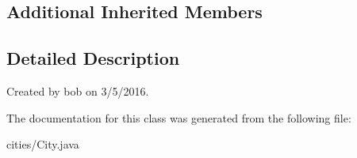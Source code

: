\subsection*{Additional Inherited Members}


\subsection{Detailed Description}
Created by bob on 3/5/2016. 

The documentation for this class was generated from the following file\+:\begin{DoxyCompactItemize}
\item 
cities/City.\+java\end{DoxyCompactItemize}
